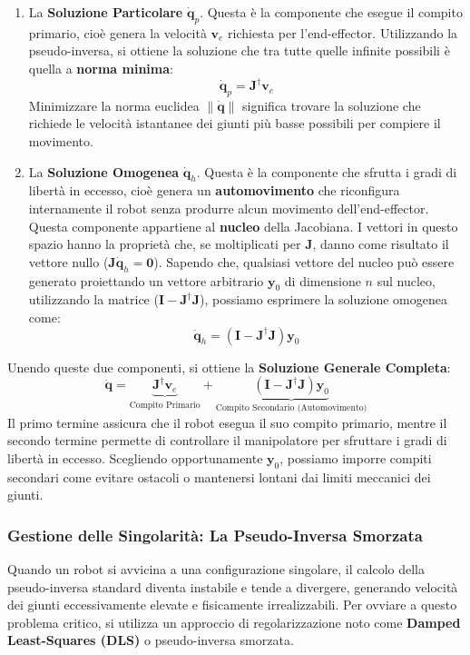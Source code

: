 \documentclass[11pt, a4paper]{report}
\begin{document}
\begin{enumerate}
    \item La \textbf{Soluzione Particolare} \(\dot{\bm{q}}_p\). Questa è la componente che esegue il compito primario, cioè genera la velocità \(\bm{v}_e\) richiesta per l'end-effector. Utilizzando la pseudo-inversa, si ottiene la soluzione che tra tutte quelle infinite possibili è quella a \textbf{norma minima}:
    \[
        \dot{\bm{q}}_p = \bm{J}^{\dagger}\bm{v}_e
    \]
    Minimizzare la norma euclidea \(\|\dot{\bm{q}}\|\) significa trovare la soluzione che richiede le velocità istantanee dei giunti più basse possibili per compiere il movimento.

    \item La \textbf{Soluzione Omogenea} \(\dot{\bm{q}}_h\). Questa è la componente che sfrutta i gradi di libertà in eccesso, cioè genera un \textbf{automovimento} che riconfigura internamente il robot senza produrre alcun movimento dell'end-effector. Questa componente appartiene al \textbf{nucleo} della Jacobiana. I vettori in questo spazio hanno la proprietà che, se moltiplicati per \(\bm{J}\), danno come risultato il vettore nullo (\(\bm{J}\dot{\bm{q}}_h = \bm{0}\)). Sapendo che, qualsiasi vettore del nucleo può essere generato proiettando un vettore arbitrario \(\bm{y}_0\) di dimensione \(n\) sul nucleo, utilizzando la matrice (\(\bm{I} - \bm{J}^{\dagger}\bm{J}\)), possiamo esprimere la soluzione omogenea come:
    \[
        \dot{\bm{q}}_h = (\bm{I} - \bm{J}^{\dagger}\bm{J})\bm{y}_0
    \]
\end{enumerate}
Unendo queste due componenti, si ottiene la \textbf{Soluzione Generale Completa}:
\[
    \dot{\bm{q}} = \underbrace{\bm{J}^{\dagger}\bm{v}_e}_{\text{Compito Primario}} + \underbrace{(\bm{I} - \bm{J}^{\dagger}\bm{J})\bm{y}_0}_{\text{Compito Secondario (Automovimento)}}
\]
Il primo termine assicura che il robot esegua il suo compito primario, mentre il secondo termine permette di controllare il manipolatore per sfruttare i gradi di libertà in eccesso. Scegliendo opportunamente \(\bm{y}_0\), possiamo imporre compiti secondari come evitare ostacoli o mantenersi lontani dai limiti meccanici dei giunti.

\subsubsection{Gestione delle Singolarità: La Pseudo-Inversa Smorzata}
Quando un robot si avvicina a una configurazione singolare, il calcolo della pseudo-inversa standard diventa instabile e tende a divergere, generando velocità dei giunti eccessivamente elevate e fisicamente irrealizzabili. Per ovviare a questo problema critico, si utilizza un approccio di regolarizzazione noto come \textbf{Damped Least-Squares (DLS)} o pseudo-inversa smorzata.
\end{document}

